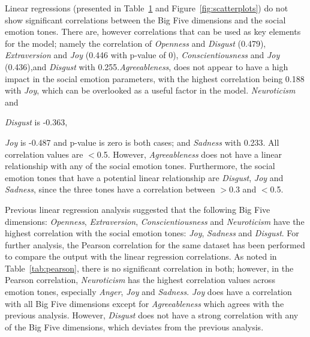 \documentclass[graybox]{svmult}
\begin{document}
{\begin{table}[!ht]
{\begin{tabular}{@{}llll|lll|lll|lll|lll@{}}
\bottomrule

\end{tabular}%
}
\label{tbl:linreg}
\end{table}

Linear regressions (presented in Table~\ref{tbl:linreg} and
Figure~\ref{fig:scatterplots}) do not show significant correlations
between the Big Five dimensions and the social emotion tones. There
are, however correlations that can be used as key elements for the
model; namely the correlation of {\emph{Openness} and {\emph{Disgust}}
(0.479), {\emph{Extraversion}} and {\emph{Joy}} (0.446 with p-value of
0), {\emph{Conscientiousness}} and {\emph{Joy}} (0.436),and
\emph{Disgust}} with 0.255.{\emph{Agreeableness}}, does not appear to
have a high impact in the social emotion parameters, with the highest
correlation being 0.188 with {\emph{Joy}}, which can be overlooked as
a useful factor in the model. {\emph{Neuroticism}} and {\emph{Disgust}
is -0.363, {\emph{Joy} is -0.487 and p-value is zero is both cases;
and {\emph{Sadness}} with 0.233. All correlation values are
$<$0.5. However, {\emph{Agreeableness}} does not have a linear
relationship with any of the social emotion tones. Furthermore, the
social emotion tones that have a potential linear relationship are
{\emph{Disgust}}, {\emph{Joy}} and {\emph{Sadness}}, since the three
tones have a correlation between $>$0.3 and $<$0.5.

Previous linear regression analysis suggested that the following Big
Five dimensions: {\emph{Openness}}, {\emph{Extraversion}},
{\emph{Conscientiousness}} and {\emph{Neuroticism}} have the highest
correlation with the social emotion tones: {\emph{Joy}},
{\emph{Sadness}} and {\emph{Disgust}}. For further analysis, the
Pearson correlation for the same dataset has been performed to compare
the output with the linear regression correlations. As noted in
Table~\ref{tab:pearson}, there is no significant correlation in both;
however, in the Pearson correlation, {\emph{Neuroticism}} has the
highest correlation values across emotion tones, especially
{\emph{Anger}}, {\emph{Joy}} and {\emph{Sadness}}. {\emph{Joy}} does
have a correlation with all Big Five dimensions except for
{\emph{Agreeableness}} which agrees with the previous
analysis. However, {\emph{Disgust}} does not have a strong correlation
with any of the Big Five dimensions, which deviates from the previous
analysis.

}}}
\end{document}
